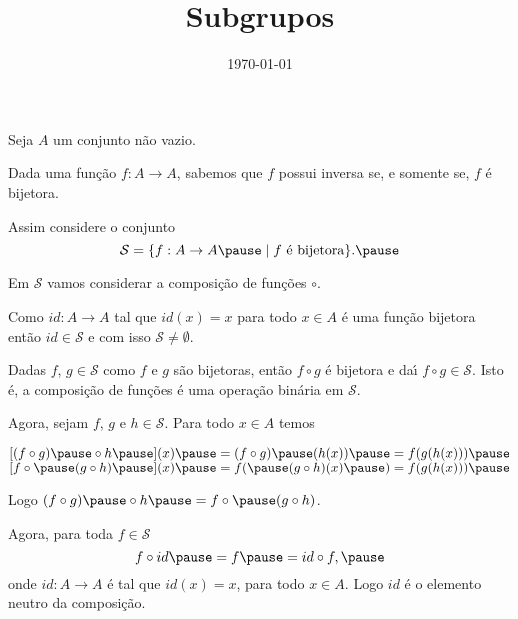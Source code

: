 \documentclass{beamer}
\title{Subgrupos}
\author[\autor]{\autor}
\institute[\instituto]{\instituto}
\date{\today}
\begin{document}
    \begin{frame}
        \maketitle
    \end{frame}


    \begin{frame}
        Seja $A$ um conjunto n\~ao vazio.\pause

        \vspace{.3cm}

        Dada uma fun\c{c}\~ao $f : A \to A$, sabemos que $f$ possui inversa \pause se, e somente se, $f$ \'e bijetora.\pause

        \vspace{.3cm}

        Assim considere o conjunto\pause
        \[
            \mathcal{S} = \{ f : A \to A \pause \mid f \mbox{ \'e bijetora}\}.\pause
        \]

        Em $\mathcal{S}$ vamos considerar a composi\c{c}\~ao de fun\c{c}\~oes $\circ$.\pause

        \vspace{.3cm}

        Como $id : A \to A$ tal que $id(x) = x$ para todo $x \in A$ \pause \'e uma fun\c{c}\~ao bijetora \pause ent\~ao $id \in \mathcal{S}$ \pause e com isso $\mathcal{S} \ne \emptyset$.
    \end{frame}

    \begin{frame}
        Dadas $f$, $g \in \mathcal{S}$ \pause como $f$ e $g$ s\~ao bijetoras, \pause ent\~ao $f \circ g$ \'e bijetora \pause e da{\'\i} $f \circ g \in \mathcal{S}$. \pause Isto \'e, \pause a composi\c{c}\~ao de fun\c{c}\~oes \pause \'e uma opera\c{c}\~ao bin\'aria em $\mathcal{S}$.

        \vspace{.3cm}

        Agora, sejam $f$, $g$ e $h \in \mathcal{S}$. \pause Para todo $x \in A$ temos\pause
        \begin{center}
            $[(f\circ g) \pause \circ h \pause](x) \pause = (f \circ g) \pause(h(x)) \pause = f(g(h(x))) \pause$\\
            $[f\circ \pause(g\circ h) \pause](x) \pause = f( \pause(g\circ h)(x) \pause) = f(g(h(x))) \pause$
        \end{center}

        Logo $(f\circ g) \pause \circ h  \pause = f\circ \pause (g\circ h)$. \pause

        \vspace{.3cm}

        Agora, para toda $f \in \mathcal{S}$\pause
        \[
            f\circ id  \pause = f  \pause = id\circ f, \pause
        \]
        onde $id : A \to A$ \pause \'e tal que $id(x) = x$, \pause para todo $x \in A$. \pause Logo $id$ \'e o elemento neutro da composi\c{c}\~ao.\pause

    \end{frame}
\end{document}
